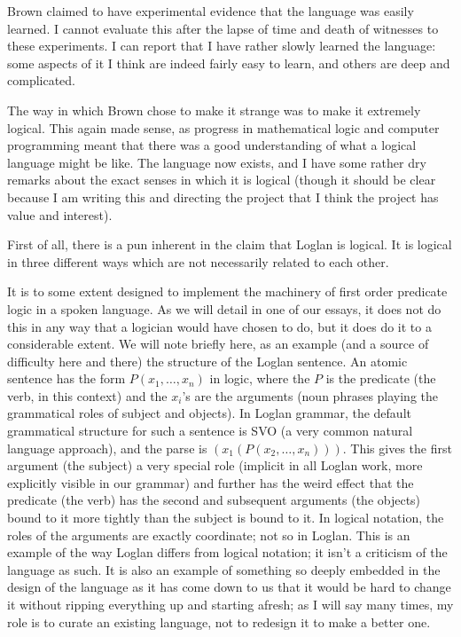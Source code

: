 \documentclass[12pt]{article}
\begin{document}
Brown claimed to have experimental evidence that the language was easily learned.  I cannot evaluate this after the lapse of time and death of witnesses to these experiments.  I can report that I have rather slowly learned the language:  some aspects of it I think are indeed fairly easy to learn, and others are deep and complicated.

The way in which Brown chose to make it strange was to make it extremely logical.  This again made sense, as progress in mathematical logic and computer programming meant that there was a good understanding of what a logical language might be like.  The language now exists, and I have some rather dry remarks about the exact senses in which it is logical (though it should be clear because I am writing this and directing the project that I think the project has value and interest).

First of all, there is a pun inherent in the claim that Loglan is logical.  It is logical in three different ways which are not necessarily related to each other.

It is to some extent designed to implement the machinery of first order predicate logic in a spoken language.  As we will detail in one of our essays, it does not do this in any way that a logician would have chosen to do, but it does do it to a considerable extent.  We will note briefly here, as an example (and a source of difficulty here and there) the structure of the Loglan sentence.  An atomic sentence has the form $P(x_1,\ldots,x_n)$ in logic, where the $P$ is the predicate (the verb, in this context) and the $x_i$'s are the arguments (noun phrases playing the grammatical roles of subject and objects).  In Loglan grammar, the default grammatical structure for such a sentence is SVO (a very common natural language approach), and the parse is $(x_1(P(x_2,\ldots,x_n)))$.  This gives the first argument (the subject) a very special role
(implicit in all Loglan work, more explicitly visible in our grammar) and further has the weird effect that the predicate (the verb) has the second and subsequent arguments (the objects) bound to it more tightly than the subject is bound to it.  In logical notation, the roles of the arguments are exactly coordinate;  not so in Loglan.  This is an example of the way Loglan differs from logical notation;  it isn't a criticism of the language as such.  It is also an example of something so deeply embedded in the design of the language as it has come down to us that it would be hard to change it without ripping everything up and starting afresh;  as I will say many times, my role is to curate an existing language, not to redesign it to make a better one.
\end{document}
